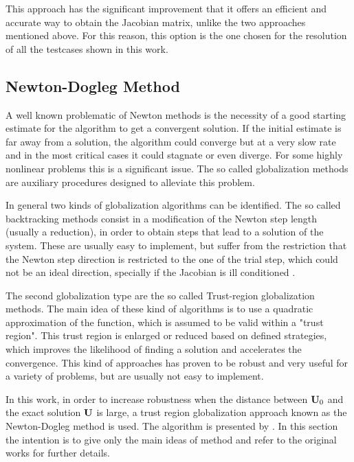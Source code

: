 This approach has the significant improvement that it offers an efficient and accurate way to obtain the Jacobian matrix, unlike the two approaches mentioned above. For this reason, this option is the one chosen for the resolution of all the testcases shown in this work.

\subsection{Newton-Dogleg Method} \label{sec:Newton}

A well known problematic of Newton methods is the necessity of a good starting estimate for the algorithm to get a convergent solution. If the initial estimate is far away from a solution, the algorithm could converge but at a very slow rate and in the most critical cases it could stagnate or even diverge.  For some highly nonlinear problems this is a significant issue. The so called globalization methods are auxiliary procedures designed to alleviate  this problem. 

In general two kinds of globalization algorithms can be identified. The so called backtracking methods consist in a modification of the Newton step length (usually a reduction), in order to obtain steps that lead to a solution of the system. These are usually easy to implement, but suffer from the restriction that the Newton step direction is restricted to the one of the trial step, which could not be an ideal direction, specially if the Jacobian is ill conditioned \parencite{pawlowskiGlobalizationTechniquesNewton2006}. 

The second globalization type are the so called Trust-region globalization methods. The main idea of these kind of algorithms is to use a quadratic approximation of the function, which is assumed to be valid within a "trust region". This trust region is enlarged or reduced based on defined strategies, which improves the likelihood of finding a solution and accelerates the convergence. This kind of approaches has proven to be robust and  very useful for a variety of problems, but are usually not easy to implement. 

In this work, in order to increase robustness when the distance between $\textbf{U}_0$ and the exact solution $\textbf{U}$ is large, a trust region globalization approach known as the Newton-Dogleg method is used. The algorithm is presented by \textcite{pawlowskiGlobalizationTechniquesNewton2006,pawlowskiInexactNewtonDogleg2008}. In this section the intention is to give only the main ideas of method and refer to the original works for further details. 

